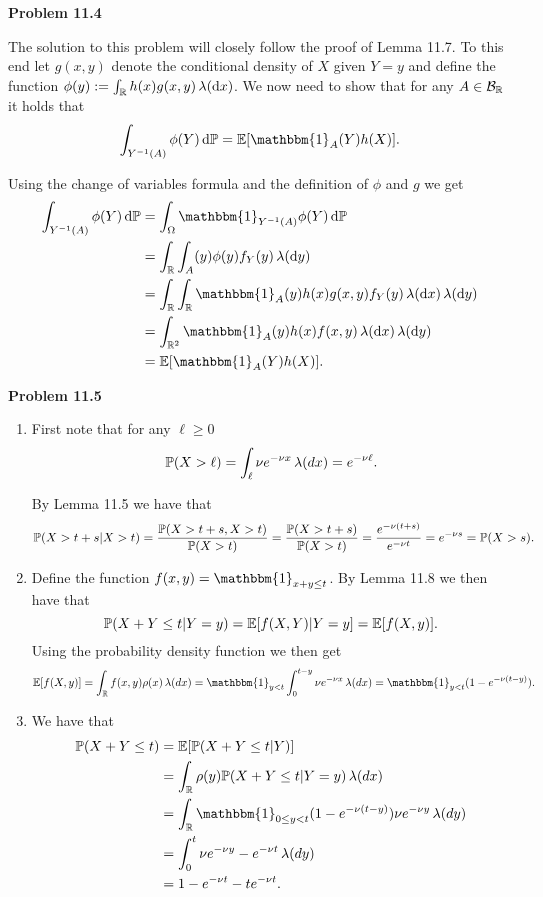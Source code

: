 \documentclass{lecturenotes}
\begin{document}
\textbf{Problem 11.4}

The solution to this problem will closely follow the proof of Lemma 11.7. To this end let $g(x,y)$ denote the conditional density of $X$ given $Y = y$ and define the function $\phi(y) := \int_{\mathbb R} h(x) g(x,y) \, \lambda(\mathrm{d} x)$. We now need to show that for any $A \in \mathcal B_{\mathbb R}$ it holds that
\[
	\int_{Y^{-1}(A)} \phi(Y) \, \dd \bbP = \bbE[\mathbbm{1}_A(Y) h(X)].
\]

Using the change of variables formula and the definition of $\phi$ and $g$ we get
\begin{align*}
	\int_{Y^{-1}(A)} \phi(Y) \, \dd \bbP &= \int_\Omega \mathbbm{1}_{Y^{-1}(A)} \phi(Y) \, \dd \bbP\\
	&= \int_\bbR \int_A(y) \phi(y) f_Y(y) \, \lambda(\dd y)\\
	&= \int_{\bbR} \int_\bbR \mathbbm{1}_A(y) h(x) g(x,y) f_Y(y)  \, \lambda(\dd x) \, \lambda(\dd y)\\
	&= \int_{\bbR^2} \mathbbm{1}_{A}(y) h(x) f(x,y) \, \lambda(\dd x) \, \lambda(\dd y)\\
	&= \bbE[\mathbbm{1}_{A}(Y) h(X)].
\end{align*}

\bigskip

\textbf{Problem 11.5}
\begin{enumerate}[label={(\alph*)}]
\item First note that for any $\ell \ge 0$ 
\[
	\mathbb P(X > \ell) = \int_{\ell} \nu e^{-\nu x} \, \lambda(dx) 
	= e^{-\nu \ell}.
\]

By Lemma 11.5 we have that
\[
	\mathbb P(X > t +s | X > t) = \frac{\mathbb P(X > t + s, X > t)}{\mathbb P(X > t)}
	= \frac{\mathbb P(X > t + s)}{\mathbb P(X > t)}
	= \frac{e^{-\nu(t + s)}}{e^{-\nu t}} = e^{-\nu s} = \mathbb P(X > s).
\]
\item Define the function $f(x,y) = \mathbbm{1}_{x + y \le t}$. By Lemma 11.8 we then have that
\[
	\mathbb P(X + Y \le t | Y = y) = \mathbb E[f(X,Y) | Y = y]
	= \mathbb E[f(X,y)].
\]
Using the probability density function we then get
\[
	\bbE[f(X,y)] = \int_{\bbR} f(x,y) \rho(x) \, \lambda(dx)
	= \mathbbm{1}_{y < t} \int_0^{t-y} \nu e^{-\nu x} \, \lambda(dx)
	= \mathbbm{1}_{y < t} (1 - e^{-\nu(t-y)}).
\]
\item We have that
\begin{align*}
	\bbP(X + Y \le t) &= \bbE[\bbP(X+Y \le t | Y)]\\
	&= \int_\bbR \rho(y) \bbP(X + Y \le t | Y = y) \, \lambda(dx)\\
	&= \int_\bbR \mathbbm{1}_{0 \le y < t} (1 - e^{-\nu(t-y)}) \nu e^{-\nu y} \, \lambda(dy) \\
	&= \int_0^t \nu e^{-\nu y} - e^{-\nu t} \, \lambda(dy) \\
	&= 1 - e^{-\nu t} - t e^{-\nu t}.
\end{align*}
\end{enumerate}
\end{document}
